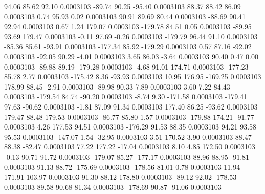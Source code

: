        94.06       85.62       92.10     0.0003103
      -89.74       90.25      -95.40     0.0003103
       88.37       88.42       86.09     0.0003103
        0.74       95.93        0.02     0.0003103
       90.91       89.69       80.44     0.0003103
      -88.69       90.41       92.94     0.0003103
        0.67        1.24      179.07     0.0003103
     -179.78       84.51        0.05     0.0003103
      -89.95       93.69      179.47     0.0003103
       -0.11       97.69       -0.26     0.0003103
     -179.79       96.44       91.10     0.0003103
      -85.36       85.61      -93.91     0.0003103
     -177.34       85.92     -179.29     0.0003103
        0.57       87.16      -92.02     0.0003103
      -92.05       90.29       -4.01     0.0003103
        3.65       86.03       -3.64     0.0003103
       90.40        0.47        0.00     0.0003103
      -89.88       89.19     -179.28     0.0003103
       -4.68       91.01      174.71     0.0003103
     -177.23       85.78        2.77     0.0003103
     -175.42        8.36      -93.93     0.0003103
       10.95      176.95     -169.25     0.0003103
      178.99       88.45       -2.91     0.0003103
      -89.98       90.33        7.89     0.0003103
        3.60        7.22       84.43     0.0003103
     -179.54       84.74      -90.20     0.0003103
       -8.74        9.30     -171.58     0.0003103
     -179.41       97.63      -90.62     0.0003103
       -1.81       87.09       91.34     0.0003103
      177.40       86.25      -93.62     0.0003103
      179.47       88.48      179.53     0.0003103
      -86.77       85.80        1.57     0.0003103
     -179.88      174.21      -91.77     0.0003103
        4.26      177.53       94.51     0.0003103
     -176.29       91.53       88.35     0.0003103
       94.21       93.58       95.53     0.0003103
     -147.07        1.54      -32.95     0.0003103
        3.51      170.52        3.90     0.0003103
       88.47       88.38      -82.47     0.0003103
       77.22      177.22      -17.04     0.0003103
        8.10        4.85      172.50     0.0003103
       -0.13       90.71       91.72     0.0003103
     -179.07       85.27     -177.17     0.0003103
       88.96       88.95      -91.81     0.0003103
       91.13       88.72     -175.69     0.0003103
     -178.56       81.01        0.78     0.0003103
       11.94      171.91      103.97     0.0003103
       91.30       88.12      178.80     0.0003103
      -89.12       92.02     -178.53     0.0003103
       89.58       90.68       81.34     0.0003103
     -178.69       90.87      -91.06     0.0003103
